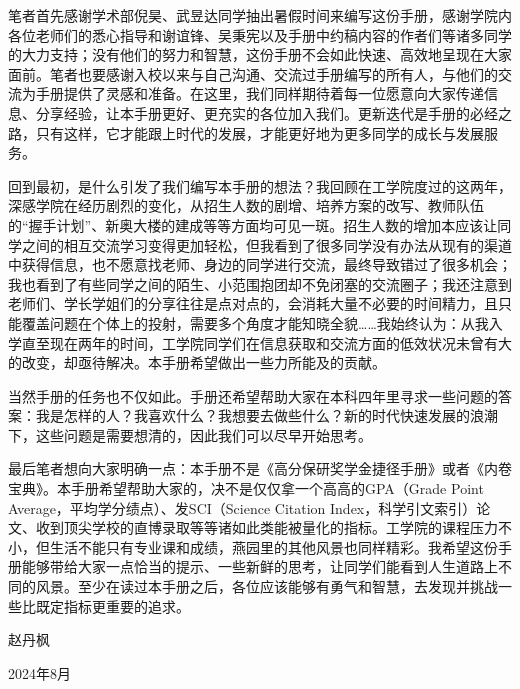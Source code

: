 \documentclass[11pt,oneside]{book}
\begin{document}
\vspace{10pt}

笔者首先感谢学术部倪昊、武昱达同学抽出暑假时间来编写这份手册，感谢学院内各位老师们的悉心指导和谢谊锋、吴秉宪以及手册中约稿内容的作者们等诸多同学的大力支持；没有他们的努力和智慧，这份手册不会如此快速、高效地呈现在大家面前。笔者也要感谢入校以来与自己沟通、交流过手册编写的所有人，与他们的交流为手册提供了灵感和准备。在这里，我们同样期待着每一位愿意向大家传递信息、分享经验，让本手册更好、更充实的各位加入我们。更新迭代是手册的必经之路，只有这样，它才能跟上时代的发展，才能更好地为更多同学的成长与发展服务。

\vspace{10pt}

回到最初，是什么引发了我们编写本手册的想法？我回顾在工学院度过的这两年，深感学院在经历剧烈的变化，从招生人数的剧增、培养方案的改写、教师队伍的“握手计划”、新奥大楼的建成等等方面均可见一斑。招生人数的增加本应该让同学之间的相互交流学习变得更加轻松，但我看到了很多同学没有办法从现有的渠道中获得信息，也不愿意找老师、身边的同学进行交流，最终导致错过了很多机会；我也看到了有些同学之间的陌生、小范围抱团却不免闭塞的交流圈子；我还注意到老师们、学长学姐们的分享往往是点对点的，会消耗大量不必要的时间精力，且只能覆盖问题在个体上的投射，需要多个角度才能知晓全貌……我始终认为：从我入学直至现在两年的时间，工学院同学们在信息获取和交流方面的低效状况未曾有大的改变，却亟待解决。本手册希望做出一些力所能及的贡献。

\vspace{10pt}

当然手册的任务也不仅如此。手册还希望帮助大家在本科四年里寻求一些问题的答案：我是怎样的人？我喜欢什么？我想要去做些什么？新的时代快速发展的浪潮下，这些问题是需要想清的，因此我们可以尽早开始思考。

\vspace{10pt}

最后笔者想向大家明确一点：本手册不是《高分保研奖学金捷径手册》或者《内卷宝典》。本手册希望帮助大家的，决不是仅仅拿一个高高的GPA（Grade Point Average，平均学分绩点）、发SCI（Science Citation Index，科学引文索引）论文、收到顶尖学校的直博录取等等诸如此类能被量化的指标。工学院的课程压力不小，但生活不能只有专业课和成绩，燕园里的其他风景也同样精彩。我希望这份手册能够带给大家一点恰当的提示、一些新鲜的思考，让同学们能看到人生道路上不同的风景。至少在读过本手册之后，各位应该能够有勇气和智慧，去发现并挑战一些比既定指标更重要的追求。
\begin{flushright}
	赵丹枫
	
	2024年8月
\end{flushright}
\end{document}
